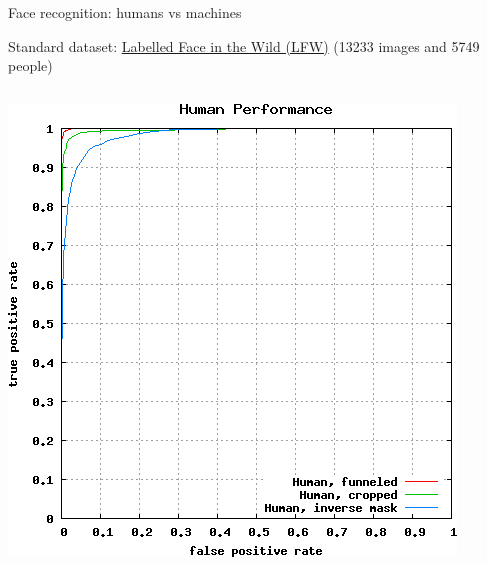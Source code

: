 \documentclass[compress]{beamer}
\begin{document}
\begin{frame}{Face recognition: humans vs machines}

    Standard dataset:
    \href{http://vis-www.cs.umass.edu/lfw/results.html}{Labelled Face in the
    Wild (LFW)} (13233 images and 5749 people)

    \begin{columns}
        \begin{column}{0.5\linewidth}
            \begin{center}
                \includegraphics[width=\linewidth]{lfw_human}
            \end{center}
        \end{column}
        \begin{column}{0.5\linewidth}
            \begin{center}

\end{center}
\end{column}
\end{columns}
\end{frame}
\end{document}
